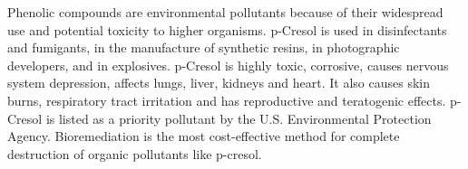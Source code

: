 \documentclass[pdftex,11pt,a4paper]{article}
\begin{document}
Phenolic compounds are environmental pollutants because of their widespread use and potential toxicity to higher organisms. p-Cresol is used in disinfectants and fumigants, in the manufacture of synthetic resins, in photographic developers, and in explosives. p-Cresol is highly toxic, corrosive, causes nervous system depression, affects lungs, liver, kidneys and heart. It also causes skin burns, respiratory tract irritation and has reproductive and teratogenic effects. p-Cresol is listed as a priority pollutant by the U.S. Environmental Protection Agency. Bioremediation is the most cost-effective method for complete destruction of organic pollutants like p-cresol.
\end{document}
